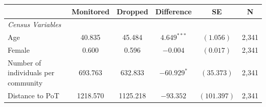 \centering
\begin{tabular}{l ccccc}
\hline\hline
 & \multicolumn{1}{c}{Monitored} & \multicolumn{1}{c}{Dropped} & \multicolumn{1}{c}{Difference} & \multicolumn{1}{c}{SE} & \multicolumn{1}{c}{N} \\
\hline
\addlinespace
\textit{Census Variables} \\
\addlinespace
Age & 40.835 & 45.484 & $4.649^{***}$ & $(1.056)$ & 2,341 \\
Female & 0.600 & 0.596 & $-0.004$ & $(0.017)$ & 2,341 \\
Number of individuals per community & 693.763 & 632.833 & $-60.929^{*}$ & $(35.373)$ & 2,341 \\
Distance to PoT & 1218.570 & 1125.218 & $-93.352$ & $(101.397)$ & 2,341 \\
\hline\hline
\end{tabular}
